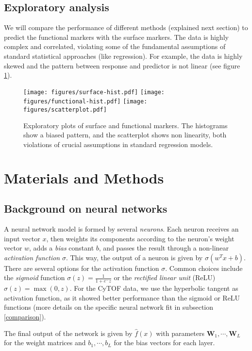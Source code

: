 \documentclass[graybox]{svmult}
\begin{document}
\subsection{Exploratory analysis}

We will compare the performance of different methods (explained next
section) to predict the functional markers with the surface markers.
The data is highly complex and correlated, violating some of the
fundamental assumptions of standard statistical approaches (like
regression). For example, the data is highly skewed and the pattern
between response and predictor is not linear (see figure
\ref{exploratory}).

\begin{figure}
\texttt{[image: figures/surface-hist.pdf]}
\texttt{[image: figures/functional-hist.pdf]}
\texttt{[image: figures/scatterplot.pdf]}
\caption{Exploratory plots of surface and functional markers. The
  histograms show a biased pattern, and the scatterplot shows non
  linearity, both violations of crucial assumptions in standard
  regression models.}
\label{exploratory}
\end{figure}


\section{Materials and Methods}

\subsection{Background on neural networks}

A neural network model is formed by several {\em neurons}. Each neuron
receives an input vector $x$, then weights its components according to
the neuron's weight vector $w$, adds a {\em bias} constant $b$, and
passes the result through a non-linear {\em activation function}
$\sigma$. This way, the output of a neuron is given by $\sigma(w^Tx +
b)$. There are several options for the activation function
$\sigma$. Common choices include the {\em sigmoid} function
$\sigma(z)=\frac{1}{1+e^-z}$ or the {\em rectified linear unit} (ReLU)
$\sigma(z)=\max(0,z)$. For the CyTOF data, we use the hyperbolic
tangent as activation function, as it showed better performance than
the sigmoid or ReLU functions (more details on the specific neural
network fit in subsection \ref{comparison}).

The final output of the network is given by $\hat{f}(x)$ with
parameters $\mathbf{W}_1,\cdots,\mathbf{W}_L$ for the weight matrices
and $b_1,\cdots,b_L$ for the bias vectors for each layer.
\end{document}
